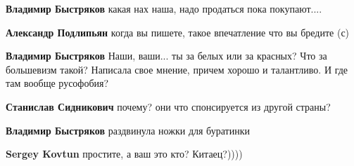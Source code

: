 \begin{itemize}
\begin{itemize}
 
\textbf{Владимир Быстряков} какая нах наша, надо продаться пока покупают....

 
\textbf{Александр Подлипьян} когда вы пишете, такое впечатление что вы бредите (с)

 
\textbf{Владимир Быстряков} Наши, ваши... ты за белых или за красных? Что за большевизм такой? Написала свое мнение, причем хорошо и талантливо. И где там вообще русофобия?

 
\textbf{Станислав Сидникович} почему? они что спонсируется из другой страны?

 
\textbf{Владимир Быстряков} раздвинула ножки для буратинки

 
\textbf{Sergey Kovtun} простите, а ваш это кто? Китаец?))))

 

\end{itemize}
\end{itemize}

